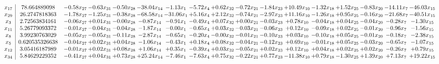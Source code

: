 \documentclass[9pt]{article}
\begin{document}
 \[\begin{array}{c| c c@{\hskip 2pt} c@{\hskip 2pt} c@{\hskip 2pt} c@{\hskip 2pt} c@{\hskip 2pt} c@{\hskip 2pt} c@{\hskip 2pt} c@{\hskip 2pt} c@{\hskip 2pt} c@{\hskip 2pt} c@{\hskip 2pt} c@{\hskip 2pt} c@{\hskip 2pt} c@{\hskip 2pt} c@{\hskip 2pt} }
 x_{17}   &  78.664889098 & -0.58 x_{27} & -0.63 x_{31} & -0.50 x_{28} & -38.04 x_{14} & -1.13 x_{1} & -5.72 x_{4} & +  0.62 x_{32} & -0.72 x_{21} & -1.84 x_{23} & + 10.49 x_{10} & -1.32 x_{18} & +  1.52 x_{25} & -0.83 x_{20} & -14.11 x_{7} & -46.03 x_{15}\\
 x_{29}   &  26.2747818363 & -1.78 x_{27} & -1.25 x_{31} & -0.38 x_{28} & -68.58 x_{14} & -31.06 x_{1} & +  5.16 x_{4} & +  2.12 x_{32} & -0.74 x_{21} & -2.97 x_{23} & + 11.16 x_{10} & -1.26 x_{18} & +  0.95 x_{25} & -0.16 x_{20} & -21.68 x_{7} & -40.51 x_{15}\\
 x_{3}   &  2.72563834161 & -0.06 x_{27} & +  0.01 x_{31} & -0.00 x_{28} & -0.87 x_{14} & -0.91 x_{1} & -0.49 x_{4} & +  0.07 x_{32} & +  0.00 x_{21} & -0.03 x_{23} & +  0.78 x_{10} & -0.04 x_{18} & +  0.04 x_{25} & -0.04 x_{20} & -0.28 x_{7} & -1.30 x_{15}\\
 x_{11}   &  5.26779093372 & -0.01 x_{27} & -0.04 x_{31} & -0.04 x_{28} & -1.87 x_{14} & -0.00 x_{1} & -0.65 x_{4} & +  0.03 x_{32} & -0.03 x_{21} & -0.06 x_{23} & +  0.12 x_{10} & -0.09 x_{18} & +  0.02 x_{25} & -0.01 x_{20} & -0.96 x_{7} & -1.56 x_{15}\\
 x_{8}   &  3.99230763029 & -0.05 x_{27} & -0.05 x_{31} & -0.11 x_{28} & -2.87 x_{14} & -0.65 x_{1} & -0.20 x_{4} & -0.00 x_{32} & -0.01 x_{21} & -0.10 x_{23} & +  0.03 x_{10} & -0.10 x_{18} & +  0.05 x_{25} & -0.01 x_{20} & -0.18 x_{7} & -2.38 x_{15}\\
 x_{5}   &  0.620535326638 & -0.04 x_{27} & +  0.02 x_{31} & +  0.04 x_{28} & -1.06 x_{14} & -0.43 x_{1} & +  0.18 x_{4} & +  0.08 x_{32} & -0.04 x_{21} & -0.12 x_{23} & +  0.69 x_{10} & -0.01 x_{18} & +  0.05 x_{25} & -0.03 x_{20} & -0.65 x_{7} & -1.07 x_{15}\\
 x_{12}   &  3.05416187989 & -0.01 x_{27} & +  0.02 x_{31} & +  0.08 x_{28} & +  1.06 x_{14} & +  0.35 x_{1} & -0.39 x_{4} & +  0.03 x_{32} & -0.05 x_{21} & +  0.02 x_{23} & +  0.12 x_{10} & +  0.04 x_{18} & +  0.02 x_{25} & +  0.02 x_{20} & -0.26 x_{7} & +  0.79 x_{15}\\
 x_{34}   &  5.84629229352 & -0.41 x_{27} & +  0.04 x_{31} & +  0.73 x_{28} & + 25.24 x_{14} & -7.46 x_{1} & -7.63 x_{4} & +  0.75 x_{32} & -0.22 x_{21} & +  0.77 x_{23} & -11.38 x_{10} & +  0.79 x_{18} & -1.30 x_{25} & +  1.39 x_{20} & +  7.13 x_{7} & + 19.22 x_{15}\\

\end{array}\]
\end{document}
